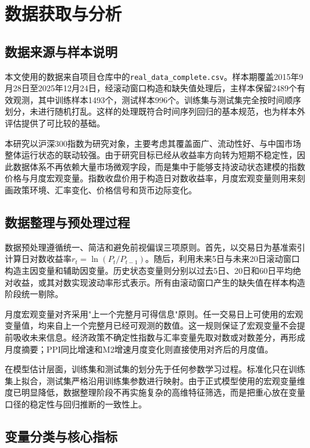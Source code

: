 
\section{数据获取与分析}

\subsection{数据来源与样本说明}

本文使用的数据来自项目仓库中的\texttt{real\_data\_complete.csv}。样本期覆盖2015年9月28日至2025年12月24日，经滚动窗口构造和缺失值处理后，主样本保留2489个有效观测，其中训练样本1493个，测试样本996个。训练集与测试集完全按时间顺序划分，未进行随机打乱。这样的处理既符合时间序列回归的基本规范，也为样本外评估提供了可比较的基础。

本研究以沪深300指数为研究对象，主要考虑其覆盖面广、流动性好、与中国市场整体运行状态的联动较强。由于研究目标已经从收益率方向转为短期不稳定性，因此数据体系不再依赖大量市场微观字段，而是集中于能够支持波动状态建模的指数价格与月度宏观变量。指数收盘价用于构造日对数收益率，月度宏观变量则用来刻画政策环境、汇率变化、价格信号和货币边际变化。

\subsection{数据整理与预处理过程}

数据预处理遵循统一、简洁和避免前视偏误三项原则。首先，以交易日为基准索引计算日对数收益率\(r_t=\ln(P_t/P_{t-1})\)。随后，利用未来5日与未来20日滚动窗口构造主因变量和辅助因变量。历史状态变量则分别以过去5日、20日和60日平均绝对收益，或其对数实现波动率形式表示。所有由滚动窗口产生的缺失值在样本构造阶段统一剔除。

月度宏观变量对齐采用"上一个完整月可得信息"原则。任一交易日上可使用的宏观变量值，均来自上一个完整月已经可观测的数值。这一规则保证了宏观变量不会提前吸收未来信息。经济政策不确定性指数与汇率变量先取对数或对数差分，再形成月度摘要；PPI同比增速和M2增速月度变化则直接使用对齐后的月度值。

在模型估计层面，训练集和测试集的划分先于任何参数学习过程。标准化只在训练集上拟合，测试集严格沿用训练集参数进行映射。由于正式模型使用的宏观变量维度已明显降低，数据整理阶段不再实施复杂的高维特征筛选，而是把重心放在变量口径的稳定性与回归推断的一致性上。

\subsection{变量分类与核心指标}

